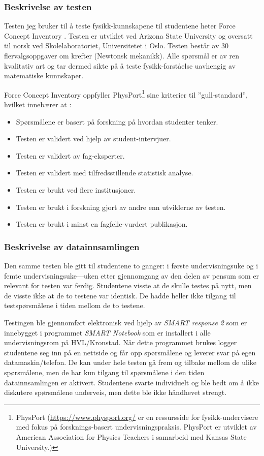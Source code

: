 \documentclass[a4paper,norsk,12pt]{article}
\begin{document}
\subsubsection{Beskrivelse av testen}
Testen jeg bruker til å teste fysikk-kunnskapene til studentene heter Force Concept Inventory \cite{1992FCI}. Testen er utviklet ved Arizona State University og oversatt til norsk ved Skolelaboratoriet, Universitetet i Oslo. Testen består av 30 flervalgsoppgaver om krefter (Newtonsk mekanikk). Alle spørsmål er av ren kvalitativ art og tar dermed sikte på å teste fysikk-forståelse uavhengig av matematiske kunnskaper. 

Force Concept Inventory oppfyller PhysPort\footnote{PhysPort (\url{https://www.physport.org/} er en ressursside for fysikk-undervisere med fokus på forsknings-basert undervisningspraksis. PhysPort er utviklet av American Association for Physics Teachers i samarbeid med Kansas State University.)} sine kriterier til ''gull-standard'', hvilket innebærer at \cite{2014arXiv1404.6500M}:
\begin{itemize}
\item
Spørsmålene er basert på forskning på hvordan studenter tenker.
\item
Testen er validert ved hjelp av student-intervjuer.
\item
Testen er validert av fag-eksperter.
\item
Testen er validert med tilfredsstillende statistisk analyse.
\item
Testen er brukt ved flere institusjoner.
\item
Testen er brukt i forskning gjort av andre enn utviklerne av testen.
\item
Testen er brukt i minst en fagfelle-vurdert publikasjon.
\end{itemize}

\subsubsection{Beskrivelse av datainnsamlingen}
Den samme testen ble gitt til studentene to ganger: i første undervisningsuke og i femte undervisningsuke---uken etter gjennomgang av den delen av pensum som er relevant for testen var ferdig. Studentene visste at de skulle testes på nytt, men de visste ikke at de to testene var identisk. De hadde heller ikke tilgang til testspørsmålene i tiden mellom de to testene. 

Testingen ble gjennomført elektronisk ved hjelp av \emph{SMART response 2} som er innebygget i programmet \emph{SMART Notebook} \cite{smart} som er installert i alle undervisningsrom på HVL/Kronstad. Når dette programmet brukes logger studentene seg inn på en nettside og får opp spørs\-målene og leverer svar på egen datamaskin/telefon. De kan under hele testen gå frem og tilbake mellom de ulike spørsmålene, men de har kun tilgang til spørsmålene i den tiden datainnsamlingen er aktivert. Studentene svarte individuelt og ble bedt om å ikke diskutere spørsmålene underveis, men dette ble ikke håndhevet strengt. 
\end{document}
